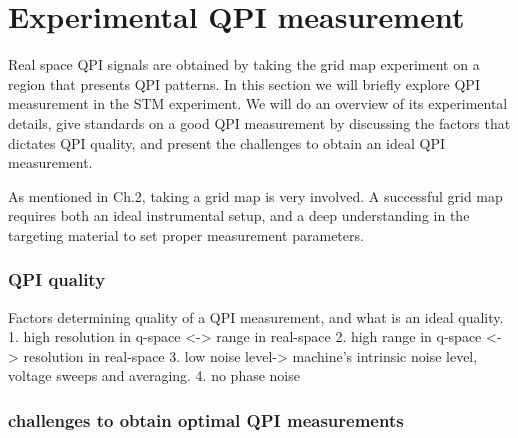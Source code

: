 \section{Experimental QPI measurement}
Real space \ac{QPI} signals are obtained by taking the grid map experiment on a region that presents \ac{QPI} patterns. In this section we will briefly explore \ac{QPI} measurement in the \ac{STM} experiment. We will do an overview of its experimental details, give standards on a good \ac{QPI} measurement by discussing the factors that dictates \ac{QPI} quality, and present the challenges to obtain an ideal \ac{QPI} measurement.

As mentioned in Ch.2, taking a grid map is very involved. A successful grid map requires both an ideal instrumental setup, and a deep understanding in the targeting material to set proper measurement parameters. 

\subsubsection{QPI quality}
Factors determining quality of a QPI measurement, and what is an ideal quality. 
1. high resolution in q-space <-> range in real-space
2. high range in q-space <-> resolution in real-space
3. low noise level-> machine's intrinsic noise level, voltage sweeps and averaging.
4. no phase noise 
\subsubsection{challenges to obtain optimal QPI measurements}